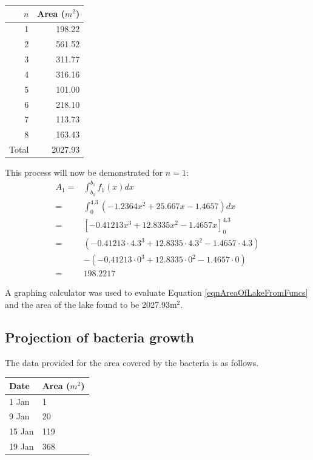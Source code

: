\documentclass[a4paper]{article}
\theoremstyle{definition}
\begin{document}
        \begin{center}
            \centering
            \begin{tabular}{@{}rr@{}}
                \toprule
                $n$ & Area ($m^2$) \\ \midrule
                1       & 198.22       \\
                2       & 561.52       \\
                3       & 311.77       \\
                4       & 316.16       \\
                5       & 101.00       \\
                6       & 218.10       \\
                7       & 113.73       \\
                8       & 163.43       \\ \midrule
                Total   & 2027.93      \\ \bottomrule
            \end{tabular}
        \end{center}

        This process will now be demonstrated for $n = 1$:
        \begin{align*} %
            A_1 =& \int_{b_0}^{b_1} f_1(x)dx \\
            =& \int_{0}^{4.3} \left(-1.2364x^2 + 25.667x - 1.4657\right)dx \\
            =& \left[-0.41213x^3 + 12.8335x^2 - 1.4657x\right]_0^{4.3} \\
            =& (-0.41213 \cdot 4.3^3 + 12.8335 \cdot 4.3^2 - 1.4657 \cdot 4.3) \\ &- (-0.41213 \cdot 0^3 + 12.8335 \cdot 0^2 - 1.4657 \cdot 0) \\
            =& 198.2217
        \end{align*}


        A graphing calculator was used to evaluate Equation \ref{eqnAreaOfLakeFromFuncs} and the area of the lake found to be 2027.93m$^2$.

    \subsection{Projection of bacteria growth}
        The data provided for the area covered by the bacteria is as follows.

        \begin{center}
            \begin{tabular}{@{}ll@{}}
                \toprule
                Date   & Area ($m^2$) \\ \midrule
                1 Jan  & 1            \\
                9 Jan  & 20           \\
                15 Jan & 119          \\
                19 Jan & 368          \\ \bottomrule
            \end{tabular}
        \end{center}
\end{document}
